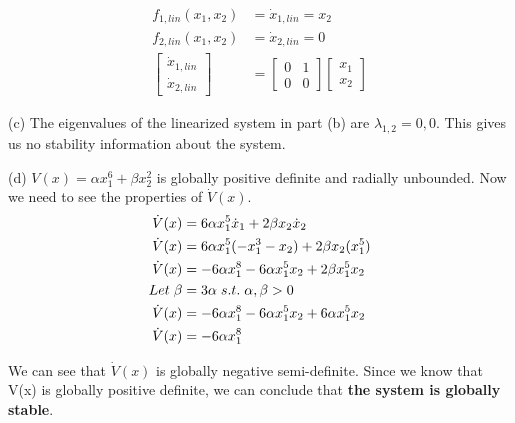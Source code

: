 \documentclass{article}
\begin{document}
  \begin{align*}
    f_{1, lin}(x_1,x_2) &= \dot{x}_{1,lin} = x_2 \\
    f_{2, lin}(x_1,x_2) &= \dot{x}_{2,lin} =  0 \\
    \begin{bmatrix}
      \dot{x}_{1,lin} \\
      \dot{x}_{2,lin} 
    \end{bmatrix} &=
    \begin{bmatrix}
      0 & 1 \\
      0 & 0
    \end{bmatrix}
    \begin{bmatrix}
      x_1 \\
      x_2 
    \end{bmatrix}
  \end{align*}

  (c) The eigenvalues of the linearized system in part (b) are
  $\lambda_{1,2}=0,0$. This gives us no stability information about the system.

  \newpage (d) $V(x)=\alpha x_1^6 + \beta x_2^2$ is globally positive definite and
  radially unbounded. Now we need to see the properties of $\dot{V}(x)$.
  \begin{align*}
    \dot{V}(x) &= 6\alpha x_1^5\dot{x}_1 + 2\beta x_2\dot{x}_2 \\
    \dot{V}(x) &= 6\alpha x_1^5(-x_1^3 - x_2) + 2\beta x_2(x_1^5) \\
    \dot{V}(x) &= -6\alpha x_1^8 - 6\alpha x_1^5x_2 + 2\beta x_1^5x_2 \\
    Let \hspace{1.0mm} \beta &= 3\alpha \hspace{1.0mm} s.t. \hspace{1.0mm} \alpha , \beta >0 \\
    \dot{V}(x) &= -6\alpha x_1^8 - 6\alpha x_1^5x_2 + 6\alpha x_1^5x_2 \\
    \dot{V}(x) &= -6\alpha x_1^8 
  \end{align*}  

  We can see that $\dot{V}(x)$ is globally negative semi-definite. Since we know
  that V(x) is globally positive definite, we can conclude that \textbf{the
    system is globally stable}. \newline \newline
\end{document}
